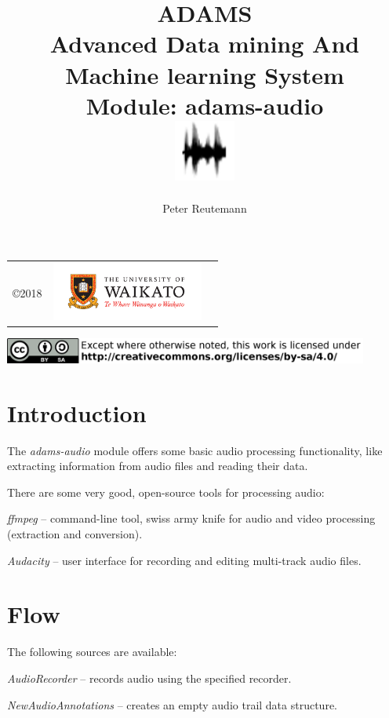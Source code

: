 \documentclass[a4paper]{book}
\title{
  \textbf{ADAMS} \\
  {\Large \textbf{A}dvanced \textbf{D}ata mining \textbf{A}nd \textbf{M}achine
  learning \textbf{S}ystem} \\
  {\Large Module: adams-audio} \\
  \vspace{1cm}
  \includegraphics[width=2cm]{images/audio-module.png} \\
}
\author{
  Peter Reutemann
}
\begin{document}
\begin{titlepage}
\maketitle

\thispagestyle{empty}
\center
\begin{table}[b]
	\begin{tabular}{c l l}
		\parbox[c][2cm]{2cm}{\copyright 2018} &
		\parbox[c][2cm]{5cm}{\includegraphics[width=5cm]{images/coat_of_arms.pdf}} \\
	\end{tabular}
	\includegraphics[width=12cm]{images/cc.png} \\
\end{table}

\end{titlepage}

\tableofcontents

\chapter{Introduction}
The \textit{adams-audio} module offers some basic audio processing functionality,
like extracting information from audio files and reading their data.

There are some very good, open-source tools for processing audio:
\begin{tight_itemize}
  \item \textit{ffmpeg}\cite{ffmpeg} -- command-line tool, swiss army knife
  for audio and video processing (extraction and conversion).
  \item \textit{Audacity}\cite{audacity} -- user interface for recording and
  editing multi-track audio files.
\end{tight_itemize}


\chapter{Flow}
The following sources are available:
\begin{tight_itemize}
  \item \textit{AudioRecorder} -- records audio using the specified recorder.
  \item \textit{NewAudioAnnotations} -- creates an empty audio trail data structure.
\end{tight_itemize}
\end{document}
